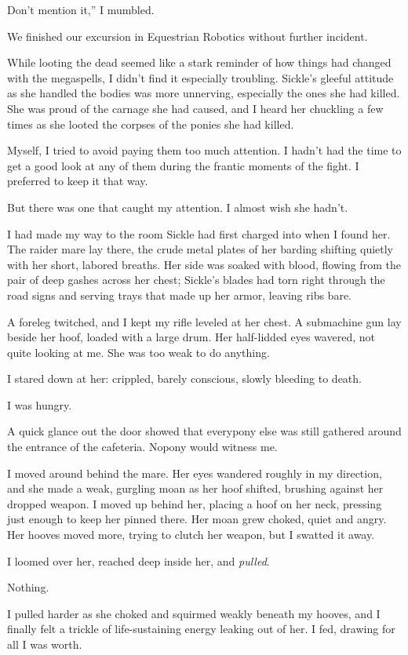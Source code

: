\leavevmode{}Don’t mention it,” I mumbled.

{\br}%
We finished our excursion in Equestrian Robotics without further incident.

While looting the dead seemed like a stark reminder of how things had changed with the megaspells, I didn’t find it especially troubling. Sickle’s gleeful attitude as she handled the bodies was more unnerving, especially the ones she had killed. She was proud of the carnage she had caused, and I heard her chuckling a few times as she looted the corpses of the ponies she had killed.

Myself, I tried to avoid paying them too much attention. I hadn’t had the time to get a good look at any of them during the frantic moments of the fight. I preferred to keep it that way.

But there was one that caught my attention. I almost wish she hadn’t.

I had made my way to the room Sickle had first charged into when I found her. The raider mare lay there, the crude metal plates of her barding shifting quietly with her short, labored breaths. Her side was soaked with blood, flowing from the pair of deep gashes across her chest; Sickle’s blades had torn right through the road signs and serving trays that made up her armor, leaving ribs bare.

A foreleg twitched, and I kept my rifle leveled at her chest. A submachine gun lay beside her hoof, loaded with a large drum. Her half-lidded eyes wavered, not quite looking at me. She was too weak to do anything.

I stared down at her: crippled, barely conscious, slowly bleeding to death.

I was hungry.

A quick glance out the door showed that everypony else was still gathered around the entrance of the cafeteria. Nopony would witness me.

I moved around behind the mare. Her eyes wandered roughly in my direction, and she made a weak, gurgling moan as her hoof shifted, brushing against her dropped weapon. I moved up behind her, placing a hoof on her neck, pressing just enough to keep her pinned there. Her moan grew choked, quiet and angry. Her hooves moved more, trying to clutch her weapon, but I swatted it away.

I loomed over her, reached deep inside her, and \textit{pulled}.

Nothing.

I pulled harder as she choked and squirmed weakly beneath my hooves, and I finally felt a trickle of life-sustaining energy leaking out of her. I fed, drawing for all I was worth.

